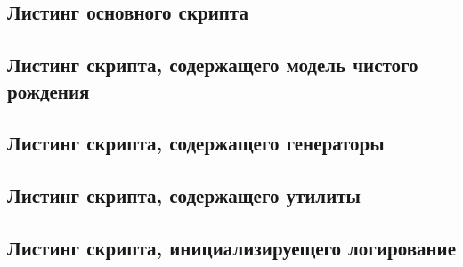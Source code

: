 \subsection*{Листинг основного скрипта}


\subsection*{Листинг скрипта, содержащего модель чистого рождения}


\subsection*{Листинг скрипта, содержащего генераторы}


\subsection*{Листинг скрипта, содержащего утилиты}


\subsection*{Листинг скрипта, инициализируещего логирование}

